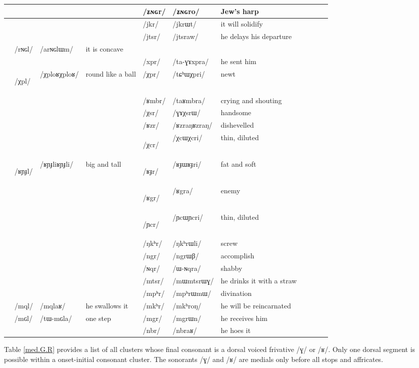 \documentclass[oneside,a4paper,11pt]{article}
\newcommand{\ipa}[1]{\mbox{\phon/#1/}}
\newcommand{\trois}[1]{\ipa{#1}\addtocounter{3clusters}{1}}
\newcommand{\tib}[1]{\cellcolor{lightgray}\textbf{#1}}
\newcommand{\idph}[1]{\cellcolor{gray}\textbf{#1}}
\newcommand{\resetcounters}[2]{
\newcounter{#1}
\newcounter{#2}
 \setcounter{#1}{\value{2clusters}}
  \setcounter{#2}{\value{3clusters}}
 \setcounter{2clusters}{0}
  \setcounter{3clusters}{0}
}
\begin{document}
\begin{table}
{\begin{tabular}{l|lll|lll|lll|l}
	&	&	&	& \trois{ʑɴɢr}  	& \ipa{ʑɴɢro}  	&Jew's harp 	\\	
\midrule							
	&	&	&	&\trois{jkr}  	& \ipa{jkrɯt}  	& it will solidify \\	
	&	&	&	&\trois{jtsr}  	& \ipa{jtsraw}  	&he delays his departure \\	
\midrule			
	& \trois{rɴɢl}  	& \ipa{arɴɢlɯm}  	&it is concave 	&	&	&\\	
	&	&	&	& \trois{xpr}  	& \ipa{ta-ɣɤxpra}  	&he sent him \\	
\midrule							
	&\trois{χpl} \idph{}	&\ipa{χploʁχploʁ}  	&round like a ball	&\trois{χpr}  	& \ipa{tɕʰɯχpri}  	& newt\\	
	&	&	&	&\trois{ʁmbr}  	& \ipa{taʁmbra}  	& crying and shouting\\	
	&	&	&	&\trois{χsr}  	& \ipa{ɣɤχsrɯ}  	& handsome \\	
	&	&	&	&\trois{ʁzr}  	& \ipa{ʁzraŋʁzraŋ}  	& dishevelled\\	
	&	&	&	&\trois{χcr} \idph{} 	& \ipa{χcɯχcri}  	& thin, diluted \\	
	&\trois{ʁɲɟl}  \idph{}	& \ipa{ʁɲɟliʁɲɟli}  	& big and tall	&\trois{ʁɟr}  \idph{}	& \ipa{ʁɟɯʁɟri}  	& fat and soft\\	
	&	&	&	&\trois{ʁgr} \tib{}  	& \ipa{ʁgra}  	& enemy\\	
\midrule							
	&	&	&	&\trois{ɲcr} \idph{} 	& \ipa{ɲcɯɲcri}  	&thin, diluted \\	
	&	&	&	&\trois{ŋkʰr}  	& \ipa{ŋkʰrɯli}  	&screw \\	
	&	&	&	&\trois{ngr}  	& \ipa{ngrɯβ}  	& accomplish \\
	&	&	&	&\trois{ɴqr}  	& \ipa{ɯ-ɴqra}  	& shabby \\	
\midrule							
	&	&	&	&\trois{mtsr}  	& \ipa{mɯmtsrɯɣ}  	&he drinks it with a straw \\	
	&	&	&	&\trois{mpʰr}  	& \ipa{mpʰrɯmɯ}  	& divination\\	
	&\trois{mql}  	& \ipa{mqlaʁ}  	& he swallows it	&\trois{mkʰr}  	& \ipa{mkʰroŋ}  	&he will be reincarnated \\	
	&\trois{mɢl}  	& \ipa{tɯ-mɢla}  	& one step	&\trois{mgr}  	& \ipa{mgrɯn}  	& he receives him\\	
\midrule							
	&	&	&	&\trois{nbr}  	& \ipa{nbraʁ}  	&he hoes it \\	
\end{tabular}}
\end{table}	
			  \resetcounters{2Clr}{3Clr} %
		Table  \ref{med.G.R} provides a  list of all clusters whose final consonant is a dorsal voiced frivative  \ipa{ɣ} or \ipa{ʁ}.  Only one dorsal segment is possible within a onset-initial consonant cluster. The sonorants \ipa{ɣ} and \ipa{ʁ} are medials only before all stops and affricates.
						
\end{document}
